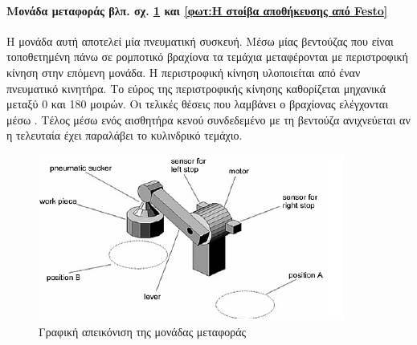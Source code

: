 \documentclass[a4paper,12pt,twoside]{report}
\begin{document}
				\paragraph{Μονάδα μεταφοράς {\footnotesize βλπ. σχ. \ref{φωτ:Η μονάδα μεταφοράς από Θράμπο} και \ref{φωτ:Η στοίβα αποθήκευσης από Festo}}} {Η μονάδα αυτή αποτελεί μία πνευματική συσκευή. Μέσω μίας βεντούζας που είναι τοποθετημένη πάνω σε ρομποτικό βραχίονα τα τεμάχια μεταφέρονται με περιστροφική κίνηση στην επόμενη μονάδα. Η περιστροφική κίνηση υλοποιείται από έναν πνευματικό κινητήρα. Το εύρος της περιστροφικής κίνησης καθορίζεται μηχανικά μεταξύ 0 και 180 μοιρών. Οι τελικές θέσεις που λαμβάνει ο βραχίονας ελέγχονται μέσω . Τέλος μέσω ενός αισθητήρα κενού συνδεδεμένο με τη βεντούζα ανιχνεύεται αν η τελευταία έχει παραλάβει το κυλινδρικό τεμάχιο.
				}
				\begin{figure}[hp]
					\centering
					\includegraphics[scale=0.7]{ChangerModulePartsThrambo.png}
					\caption{Γραφική απεικόνιση της μονάδας μεταφοράς \cite{ΤοΦυσικόΣύστημαFestoMPS}}
					\label{φωτ:Η μονάδα μεταφοράς από Θράμπο}
				\end{figure}
				
\end{document}
